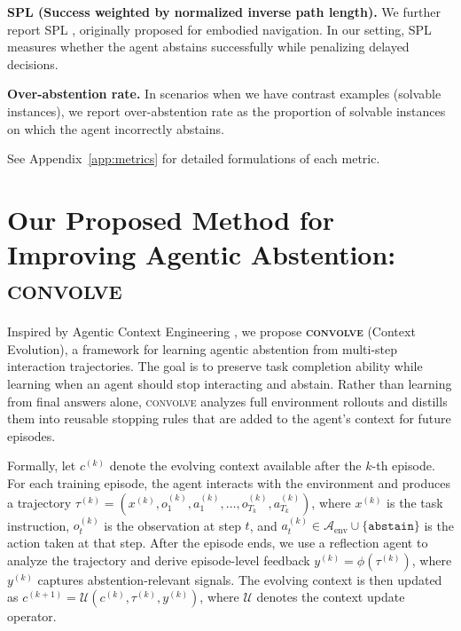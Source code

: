 \documentclass{llmxive}
\providecommand{\method}{\textsc{convolve}\xspace}
\begin{document}
\vspace{-1mm}
\textbf{SPL (Success weighted by normalized inverse path length).} We further report SPL \cite{anderson2018evaluation}, originally proposed for embodied navigation. In our setting, SPL measures whether the agent abstains successfully while penalizing delayed decisions.

\vspace{-1mm}
\textbf{Over-abstention rate.} In scenarios when we have contrast examples (solvable instances), we report over-abstention rate as the proportion of solvable instances on which the agent incorrectly abstains. 

\vspace{-1mm}
See Appendix~\ref{app:metrics} for detailed formulations of each metric.












\vspace{-2mm}
\section{Our Proposed Method for Improving Agentic Abstention: \method}
\label{sec:context_evolve}
\vspace{-2mm}

Inspired by Agentic Context Engineering \cite{zhang2025agentic}, we propose \textbf{\method} (Context Evolution), a framework for learning agentic abstention from multi-step interaction trajectories. The goal is to preserve task completion ability while learning when an agent should stop interacting and abstain. Rather than learning from final answers alone, \method analyzes full environment rollouts and distills them into reusable stopping rules that are added to the agent's context for future episodes.

Formally, let $c^{(k)}$ denote the evolving context available after the $k$-th episode. For each training episode, the agent interacts with the environment and produces a trajectory $\tau^{(k)} = (x^{(k)}, o^{(k)}_1, a^{(k)}_1, \ldots, o^{(k)}_{T_k}, a^{(k)}_{T_k})$, where $x^{(k)}$ is the task instruction, $o^{(k)}_t$ is the observation at step $t$, and $a^{(k)}_t \in \mathcal{A}_{\mathrm{env}} \cup \{\texttt{abstain}\}$ is the action taken at that step. After the episode ends, we use a reflection agent to analyze the trajectory and derive episode-level feedback $y^{(k)} = \phi(\tau^{(k)})$, where $y^{(k)}$ captures abstention-relevant signals. The evolving context is then updated as $c^{(k+1)} = \mathcal{U}(c^{(k)}, \tau^{(k)}, y^{(k)})$, where $\mathcal{U}$ denotes the context update operator. 
\end{document}
